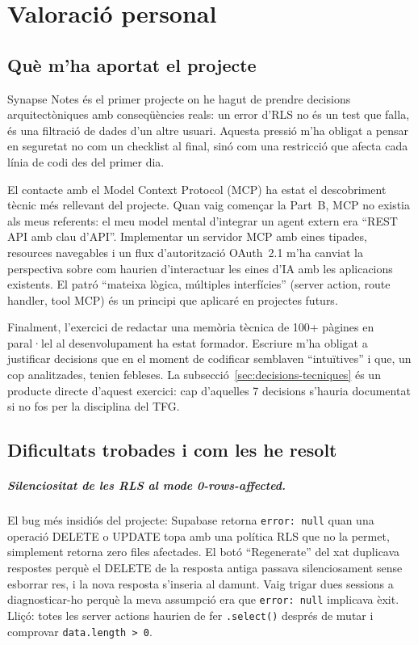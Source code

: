 \chapter{Valoració personal}
\label{ch:valoracio}

\section{Què m'ha aportat el projecte}

Synapse Notes és el primer projecte on he hagut de prendre decisions arquitectòniques amb conseqüències reals: un error d'RLS no és un test que falla, és una filtració de dades d'un altre usuari. Aquesta pressió m'ha obligat a pensar en seguretat no com un checklist al final, sinó com una restricció que afecta cada línia de codi des del primer dia.

El contacte amb el Model Context Protocol (MCP) ha estat el descobriment tècnic més rellevant del projecte. Quan vaig començar la Part~B, MCP no existia als meus referents: el meu model mental d'integrar un agent extern era ``REST API amb clau d'API''. Implementar un servidor MCP amb eines tipades, resources navegables i un flux d'autorització OAuth~2.1 m'ha canviat la perspectiva sobre com haurien d'interactuar les eines d'IA amb les aplicacions existents. El patró ``mateixa lògica, múltiples interfícies'' (server action, route handler, tool MCP) és un principi que aplicaré en projectes futurs.

Finalment, l'exercici de redactar una memòria tècnica de 100+ pàgines en paral·lel al desenvolupament ha estat formador. Escriure m'ha obligat a justificar decisions que en el moment de codificar semblaven ``intuïtives'' i que, un cop analitzades, tenien febleses. La subsecció~\ref{sec:decisions-tecniques} és un producte directe d'aquest exercici: cap d'aquelles 7 decisions s'hauria documentat si no fos per la disciplina del TFG.

\section{Dificultats trobades i com les he resolt}

\paragraph{Silenciositat de les RLS al mode 0-rows-affected.} El bug més insidiós del projecte: Supabase retorna \texttt{error: null} quan una operació DELETE o UPDATE topa amb una política RLS que no la permet, simplement retorna zero files afectades. El botó ``Regenerate'' del xat duplicava respostes perquè el DELETE de la resposta antiga passava silenciosament sense esborrar res, i la nova resposta s'inseria al damunt. Vaig trigar dues sessions a diagnosticar-ho perquè la meva assumpció era que \texttt{error: null} implicava èxit. Lliçó: totes les server actions haurien de fer \texttt{.select()} després de mutar i comprovar \texttt{data.length > 0}.

